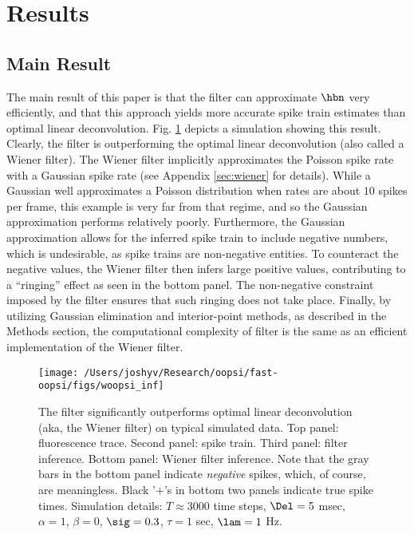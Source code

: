 \section{Results} \label{sec:results}

\subsection{Main Result} \label{sec:main}

The main result of this paper is that the \foopsi filter can approximate $\hbn$ very efficiently, and that this approach yields more accurate spike train estimates than optimal linear deconvolution.  Fig. \ref{fig:woopsi_inf} depicts a simulation showing this result. Clearly, the \foopsi filter is outperforming the optimal linear deconvolution  (also called a Wiener filter).  The Wiener filter implicitly approximates the Poisson spike rate with a Gaussian spike rate (see Appendix \ref{sec:wiener} for details). While a Gaussian well approximates a Poisson distribution when rates are about $10$ spikes per frame, this example is very far from that regime, and so the Gaussian approximation performs relatively poorly. Furthermore, the Gaussian approximation allows for the inferred spike train to include negative numbers, which is undesirable, as spike trains are non-negative entities.  To counteract the negative values, the Wiener filter then infers large positive values, contributing to a ``ringing'' effect as seen in the bottom panel.  The non-negative constraint imposed by the \foopsi filter ensures that such ringing does not take place.  Finally, by utilizing Gaussian elimination and interior-point methods, as described in the Methods section, the computational complexity of \foopsi filter is the same as an efficient implementation of the Wiener filter.  


\begin{figure}[h!]
\centering \texttt{[image: /Users/joshyv/Research/oopsi/fast-oopsi/figs/woopsi\_inf]}
\caption[\foopsi filter outperforms Wiener filter]{The \foopsi filter significantly outperforms optimal linear deconvolution (aka, the Wiener filter) on typical simulated data. Top panel: fluorescence trace.  Second panel: spike train.  Third panel: \foopsi filter inference.  Bottom panel: Wiener filter inference.  Note that the gray bars in the bottom panel indicate \emph{negative} spikes, which, of course, are meaningless. Black '$+$'s in bottom two panels indicate true spike times.  Simulation details: $T\approx 3000$ time steps, $\Del=5$ msec, $\alpha=1$, $\beta=0$, $\sig=0.3$, $\tau=1$ sec, $\lam=1$ Hz.} \label{fig:woopsi_inf}
\end{figure}


